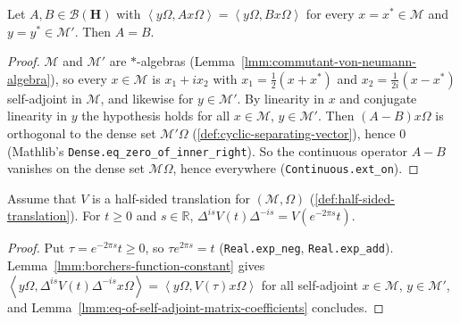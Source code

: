 \begin{lemma}
    \label{lmm:eq-of-self-adjoint-matrix-coefficients}
    \leanok
    Let $A, B \in \mathcal{B}(\mathbf{H})$ with $\left< y\Omega, Ax\Omega \right> = \left< y\Omega, Bx\Omega \right>$ for every $x = x^* \in \mathcal{M}$ and $y = y^* \in \mathcal{M}'$. Then $A = B$.
\end{lemma}
\begin{proof}
    \leanok
    $\mathcal{M}$ and $\mathcal{M}'$ are $*$-algebras (Lemma~\ref{lmm:commutant-von-neumann-algebra}), so every $x \in \mathcal{M}$ is $x_1 + ix_2$ with $x_1 = \tfrac{1}{2}(x + x^*)$ and $x_2 = \tfrac{1}{2i}(x - x^*)$ self-adjoint in $\mathcal{M}$, and likewise for $y \in \mathcal{M}'$. By linearity in $x$ and conjugate linearity in $y$ the hypothesis holds for all $x \in \mathcal{M}$, $y \in \mathcal{M}'$. Then $(A - B)x\Omega$ is orthogonal to the dense set $\mathcal{M}'\Omega$ (\ref{def:cyclic-separating-vector}), hence $0$ (Mathlib's \texttt{Dense.eq\_zero\_of\_inner\_right}). So the continuous operator $A - B$ vanishes on the dense set $\mathcal{M}\Omega$, hence everywhere (\texttt{Continuous.ext\_on}).
\end{proof}

\begin{lemma}
    \label{lmm:borchers-dilation-nonneg}
    \leanok
    Assume that $V$ is a half-sided translation for $(\mathcal{M}, \Omega)$ (\ref{def:half-sided-translation}). For $t \ge 0$ and $s \in \mathbb{R}$, $\Delta^{is}V(t)\Delta^{-is} = V(e^{-2\pi s}t)$.
\end{lemma}
\begin{proof}
    \leanok
    Put $\tau = e^{-2\pi s}t \ge 0$, so $\tau e^{2\pi s} = t$ (\texttt{Real.exp\_neg}, \texttt{Real.exp\_add}). Lemma~\ref{lmm:borchers-function-constant} gives $\left< y\Omega, \Delta^{is}V(t)\Delta^{-is}x\Omega \right> = \left< y\Omega, V(\tau)x\Omega \right>$ for all self-adjoint $x \in \mathcal{M}$, $y \in \mathcal{M}'$, and Lemma~\ref{lmm:eq-of-self-adjoint-matrix-coefficients} concludes.
\end{proof}

